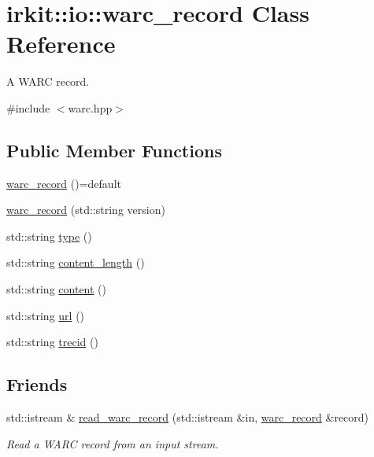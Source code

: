 \hypertarget{classirkit_1_1io_1_1warc__record}{}\section{irkit\+:\+:io\+:\+:warc\+\_\+record Class Reference}
\label{classirkit_1_1io_1_1warc__record}


A W\+A\+RC record.  




{\ttfamily \#include $<$warc.\+hpp$>$}

\subsection*{Public Member Functions}
\begin{DoxyCompactItemize}
\item 
\mbox{\hyperlink{classirkit_1_1io_1_1warc__record_adbf4f3980cefeb456de898d0415b4e36}{warc\+\_\+record}} ()=default
\item 
\mbox{\hyperlink{classirkit_1_1io_1_1warc__record_a88b5dab62123bbbef9cd5b58b74e76e7}{warc\+\_\+record}} (std\+::string version)
\item 
std\+::string \mbox{\hyperlink{classirkit_1_1io_1_1warc__record_ad6fae948c69c4379a50c088eb090608e}{type}} ()
\item 
std\+::string \mbox{\hyperlink{classirkit_1_1io_1_1warc__record_ab6a7991f2ec751d5e3828ffbcf44c222}{content\+\_\+length}} ()
\item 
std\+::string \mbox{\hyperlink{classirkit_1_1io_1_1warc__record_abdf0ad04a96e45229806ff1e21d0c8b1}{content}} ()
\item 
std\+::string \mbox{\hyperlink{classirkit_1_1io_1_1warc__record_a6dc7157b59a6059ddcba169a03dd2f81}{url}} ()
\item 
std\+::string \mbox{\hyperlink{classirkit_1_1io_1_1warc__record_a57680afe8ad4340c35ddfa403420db98}{trecid}} ()
\end{DoxyCompactItemize}
\subsection*{Friends}
\begin{DoxyCompactItemize}
\item 
std\+::istream \& \mbox{\hyperlink{classirkit_1_1io_1_1warc__record_a3ffe8b4b7fc8c809d6ce483d2272f7a3}{read\+\_\+warc\+\_\+record}} (std\+::istream \&in, \mbox{\hyperlink{classirkit_1_1io_1_1warc__record}{warc\+\_\+record}} \&record)
\begin{DoxyCompactList}\small\item\em Read a W\+A\+RC record from an input stream. \end{DoxyCompactList}\end{DoxyCompactItemize}



